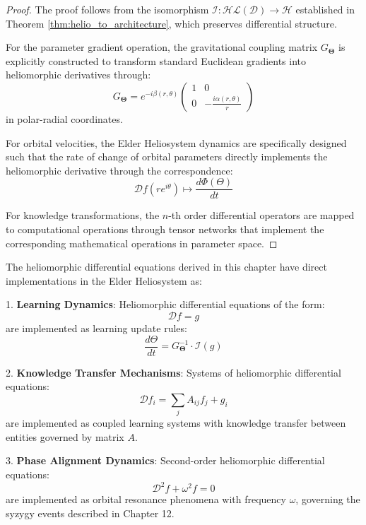 \begin{proof}
The proof follows from the isomorphism $\mathcal{I}: \mathcal{HL}(\mathcal{D}) \rightarrow \mathcal{H}$ established in Theorem \ref{thm:helio_to_architecture}, which preserves differential structure.

For the parameter gradient operation, the gravitational coupling matrix $G_{\boldsymbol{\Theta}}$ is explicitly constructed to transform standard Euclidean gradients into heliomorphic derivatives through:
\begin{equation}
G_{\boldsymbol{\Theta}} = e^{-i\beta(r,\theta)} \begin{pmatrix} 1 & 0 \\ 0 & -\frac{i\alpha(r,\theta)}{r} \end{pmatrix}
\end{equation}
in polar-radial coordinates.

For orbital velocities, the Elder Heliosystem dynamics are specifically designed such that the rate of change of orbital parameters directly implements the heliomorphic derivative through the correspondence:
\begin{equation}
\mathcal{D}f(re^{i\theta}) \mapsto \frac{d\Phi(\Theta)}{dt}
\end{equation}

For knowledge transformations, the $n$-th order differential operators are mapped to computational operations through tensor networks that implement the corresponding mathematical operations in parameter space.
\end{proof}

\begin{theorem}
\label{thm:differential_equations_implementation}
The heliomorphic differential equations derived in this chapter have direct implementations in the Elder Heliosystem as:

1. \textbf{Learning Dynamics}: Heliomorphic differential equations of the form:
\begin{equation}
\mathcal{D}f = g
\end{equation}
are implemented as learning update rules:
\begin{equation}
\frac{d\Theta}{dt} = G_{\boldsymbol{\Theta}}^{-1} \cdot \mathcal{I}(g)
\end{equation}

2. \textbf{Knowledge Transfer Mechanisms}: Systems of heliomorphic differential equations:
\begin{equation}
\mathcal{D}f_i = \sum_j A_{ij} f_j + g_i
\end{equation}
are implemented as coupled learning systems with knowledge transfer between entities governed by matrix $A$.

3. \textbf{Phase Alignment Dynamics}: Second-order heliomorphic differential equations:
\begin{equation}
\mathcal{D}^2f + \omega^2 f = 0
\end{equation}
are implemented as orbital resonance phenomena with frequency $\omega$, governing the syzygy events described in Chapter 12.
\end{theorem}

